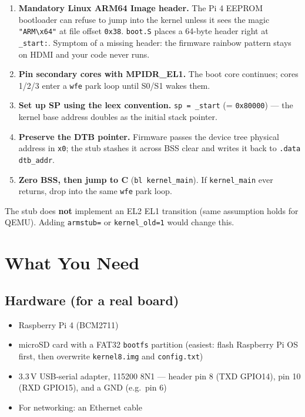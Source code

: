 \documentclass[a4paper,11pt]{article}
\begin{document}
\begin{enumerate}[leftmargin=1.6em,itemsep=2pt]
\item \textbf{Mandatory Linux ARM64 Image header.} The Pi 4 EEPROM bootloader
  can refuse to jump into the kernel unless it sees the magic \verb|"ARM\x64"|
  at file offset \verb|0x38|. \texttt{boot.S} places a 64-byte header right at
  \verb|_start:|. Symptom of a missing header: the firmware rainbow pattern
  stays on HDMI and your code never runs.
\item \textbf{Pin secondary cores with MPIDR\_EL1.} The boot core continues;
  cores 1/2/3 enter a \verb|wfe| park loop until S0/S1 wakes them.
\item \textbf{Set up SP using the leex convention.} \verb|sp = _start| (=
  \verb|0x80000|) --- the kernel base address doubles as the initial stack
  pointer.
\item \textbf{Preserve the DTB pointer.} Firmware passes the device tree
  physical address in \verb|x0|; the stub stashes it across BSS clear and
  writes it back to \verb|.data dtb_addr|.
\item \textbf{Zero BSS, then jump to C} (\verb|bl kernel_main|). If
  \verb|kernel_main| ever returns, drop into the same \verb|wfe| park loop.
\end{enumerate}

The stub does \textbf{not} implement an EL2\,\textrightarrow\,EL1 transition
(same assumption holds for QEMU). Adding \verb|armstub=| or \verb|kernel_old=1|
would change this.

\section{What You Need}

\subsection{Hardware (for a real board)}
\begin{itemize}[leftmargin=1.4em,itemsep=1pt]
\item Raspberry Pi 4 (BCM2711)
\item microSD card with a FAT32 \verb|bootfs| partition (easiest: flash
  Raspberry Pi OS first, then overwrite \verb|kernel8.img| and \verb|config.txt|)
\item 3.3\,V USB-serial adapter, 115200 8N1 --- header pin 8 (TXD\,\textrightarrow\,GPIO14),
  pin 10 (RXD\,\textrightarrow\,GPIO15), and a GND (e.g.\ pin 6)
\item For networking: an Ethernet cable
\end{itemize}
\end{document}
